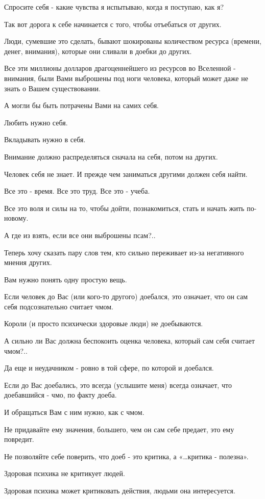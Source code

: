 Спросите себя - какие чувства я испытываю, когда я поступаю, как я?

Так вот дорога к себе начинается с того, чтобы отъебаться от других.

Люди, сумевшие это сделать, бывают шокированы количеством ресурса (времени,
денег, внимания), которые они сливали в доебки до других.

Все эти миллионы долларов драгоценнейшего из ресурсов во Вселенной - внимания,
были Вами выброшены под ноги человека, который может даже не знать о Вашем
существовании. 

А могли бы быть потрачены Вами на самих себя.

Любить нужно себя.

Вкладывать нужно в себя.

Внимание должно распределяться сначала на себя, потом на других.

Человек себя не знает. И прежде чем заниматься другими должен себя найти.

Все это - время. Все это труд. Все это - учеба.

Все это воля и силы на то, чтобы дойти, познакомиться, стать и начать жить
по-новому.

А где из взять, если все они выброшены псам?..

Теперь хочу сказать пару слов тем, кто сильно переживает из-за негативного
мнения других. 

Вам нужно понять одну простую вещь.

Если человек до Вас (или кого-то другого) доебался, это означает, что он сам
себя подсознательно считает чмом.

Короли (и просто психически здоровые люди) не доебываются.

А сильно ли Вас должна беспокоить оценка человека, который сам себя считает
чмом?..

Да еще и неудачником - ровно в той сфере, по которой и доебался.

Если до Вас доебались, это всегда (услышите меня) всегда означает, что
доебавшийся - чмо, по факту доеба. 

И обращаться Вам с ним нужно, как с чмом.

Не придавайте ему значения, большего, чем он сам себе предает, это ему
повредит.

Не позволяйте себе поверить, что доеб - это критика, а «…критика - полезна». 

Здоровая психика не критикует людей.

Здоровая психика может критиковать действия, людьми она интересуется.

